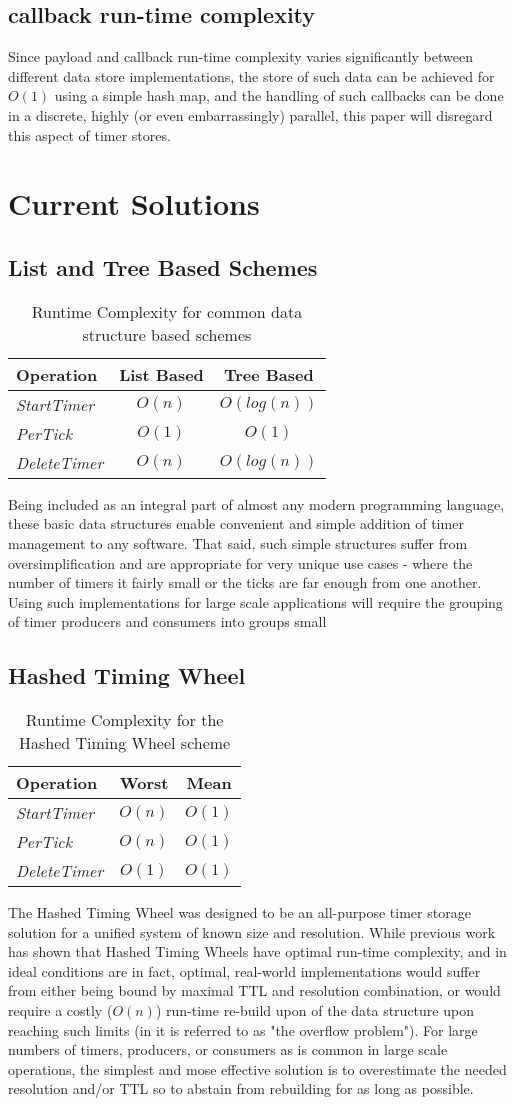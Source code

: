 \documentclass[conference]{IEEEtran}
\newcommand{\complexity}[9]{
\begin{table}[ht]
	\begin{center}
		\begin{tabular}{l|c|c}
			\textbf{Operation} & \textbf{#1} & \textbf{#2} \\
			\hline
			\textit{StartTimer} & $O(#3)$ & $O(#4)$ \\
			\textit{PerTick} & $O(#5)$ & $O(#6)$ \\
			\textit{DeleteTimer} &  $O(#7)$ & $O(#8)$ \\
		\end{tabular}
		\linebreak
		\caption{Runtime Complexity for #9}
	\end{center}
\end{table}
}
\begin{document}
\subsection{callback run-time complexity}

Since payload and callback run-time complexity varies significantly between different data store implementations, the store of such data can be achieved for $ O(1) $ using a simple hash map, and the handling of such callbacks can be done in a discrete, highly (or even embarrassingly) parallel, this paper will disregard this aspect of timer stores.


\section{Current Solutions}

\subsection{List and Tree Based Schemes}

\complexity{List Based}{Tree Based}{n}{log(n)}{1}{1}{n}{log(n)}{common data structure based schemes}

Being included as an integral part of almost any modern programming language, these basic data structures enable convenient and simple addition of timer management to any software. That said, such simple structures suffer from oversimplification and are appropriate for very unique use cases - where the number of timers it fairly small or the ticks are far enough from one another. Using such implementations for large scale applications will require the grouping of timer producers and consumers into groups small 



\subsection{Hashed Timing Wheel}
\complexity{Worst}{Mean}{n}{1}{n}{1}{1}{1}{the Hashed Timing Wheel scheme}
The Hashed Timing Wheel was designed to be an all-purpose timer storage solution for a unified system of known size and resolution\cite{TW87, TW, TWI, largescale, autoscale}. While previous work has shown that Hashed Timing Wheels have optimal run-time complexity, and in ideal conditions are in fact, optimal, real-world implementations would suffer from either being bound by maximal TTL and resolution combination, or would require a costly ($O(n)$) run-time re-build upon of the data structure upon reaching such limits (in \cite{CQ} it is referred to as "the overflow problem"). For large numbers of timers, producers, or consumers as is common in large scale operations, the simplest and mose effective solution is to overestimate the needed resolution and/or TTL so to abstain from rebuilding for as long as possible. 
\end{document}
